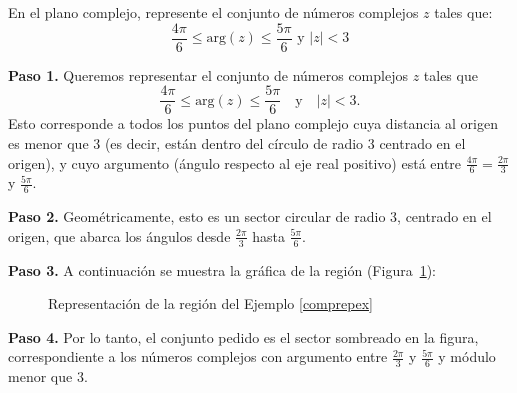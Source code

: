 \begin{example}\label{comprepex} En el plano complejo, represente el conjunto de números complejos $z$ tales que:
$$\dfrac{4\pi}{6}\leq\text{arg}(z)\leq\dfrac{5\pi}{6} \text{ y } |z|<3$$
\begin{myproof}
\textbf{Paso 1.} Queremos representar el conjunto de números complejos $z$ tales que
\[
\dfrac{4\pi}{6}\leq\text{arg}(z)\leq\dfrac{5\pi}{6} \quad \text{y} \quad |z|<3.
\]
Esto corresponde a todos los puntos del plano complejo cuya distancia al origen es menor que $3$ (es decir, están dentro del círculo de radio $3$ centrado en el origen), y cuyo argumento (ángulo respecto al eje real positivo) está entre $\frac{4\pi}{6} = \frac{2\pi}{3}$ y $\frac{5\pi}{6}$.

\textbf{Paso 2.} Geométricamente, esto es un sector circular de radio $3$, centrado en el origen, que abarca los ángulos desde $\frac{2\pi}{3}$ hasta $\frac{5\pi}{6}$.

\textbf{Paso 3.} A continuación se muestra la gráfica de la región (Figura~\ref{fig:region_sector_complejo}):

\begin{figure}[H]
\centering
{}
\caption{Representación de la región del Ejemplo \ref{comprepex}}
\label{fig:region_sector_complejo}
\end{figure}

\textbf{Paso 4.} Por lo tanto, el conjunto pedido es el sector sombreado en la figura, correspondiente a los números complejos con argumento entre $\frac{2\pi}{3}$ y $\frac{5\pi}{6}$ y módulo menor que $3$.
\end{myproof}
\end{example}

